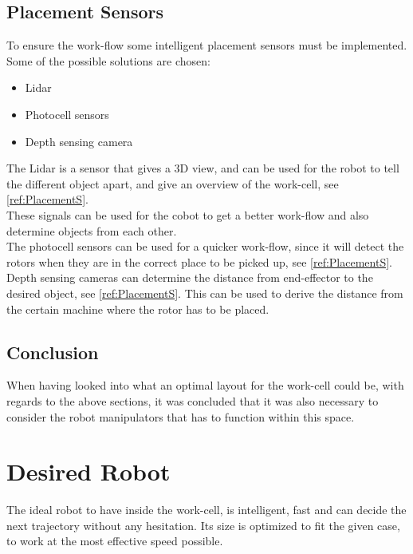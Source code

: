 \subsection{Placement Sensors}

To ensure the work-flow some intelligent placement sensors must be implemented. Some of the possible solutions are chosen:\\

\begin{itemize}
    \item Lidar
    \item Photocell sensors
    \item Depth sensing camera
\end{itemize}

The Lidar is a sensor that gives a 3D view, and can be used for the robot to tell the different object apart, and give an overview of the work-cell, see \ref{ref:PlacementS}.\\
These signals can be used for the cobot to get a better work-flow and also determine objects from each other.\\

The photocell sensors can be used for a quicker work-flow, since it will detect the rotors when they are in the correct place to be picked up, see \ref{ref:PlacementS}.\\

Depth sensing cameras can determine the distance from end-effector to the desired object, see \ref{ref:PlacementS}. This can be used to derive the distance from the certain machine where the rotor has to be placed.\\

\subsection{Conclusion}

When having looked into what an optimal layout for the work-cell could be, with regards to the above sections, it was concluded that it was also necessary to consider the robot manipulators that has to function within this space. 

\section{Desired Robot}\label{IdealRobot}

The ideal robot to have inside the work-cell, is intelligent, fast and can decide the next trajectory without any hesitation. Its size is optimized to fit the given case, to work at the most effective speed possible.\\

